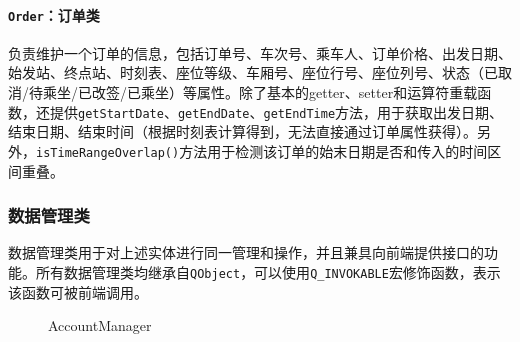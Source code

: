 \documentclass{article}
\begin{document}
	\paragraph{\texttt{Order}：订单类} 负责维护一个订单的信息，包括订单号、车次号、乘车人、订单价格、出发日期、始发站、终点站、时刻表、座位等级、车厢号、座位行号、座位列号、状态（已取消/待乘坐/已改签/已乘坐）等属性。除了基本的getter、setter和运算符重载函数，还提供\texttt{getStartDate}、\texttt{getEndDate}、\texttt{getEndTime}方法，用于获取出发日期、结束日期、结束时间（根据时刻表计算得到，无法直接通过订单属性获得）。另外，\texttt{isTimeRangeOverlap()}方法用于检测该订单的始末日期是否和传入的时间区间重叠。
	
	\subsubsection{数据管理类}
	数据管理类用于对上述实体进行同一管理和操作，并且兼具向前端提供接口的功能。所有数据管理类均继承自\texttt{QObject}，可以使用\texttt{Q\_INVOKABLE}宏修饰函数，表示该函数可被前端调用。
	
	\begin{figure}[H]
		\centering
		
		\caption{AccountManager}
		\label{AccountManager}
	\end{figure}
	
\end{document}
